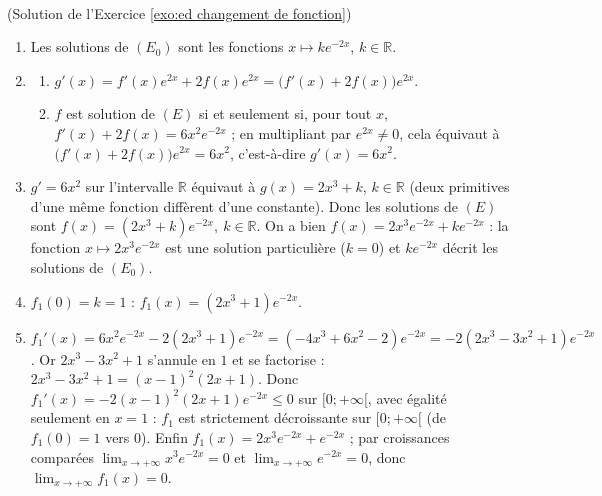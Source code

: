 \begin{corrige}
\begin{sol} ~ \\
(Solution de l'Exercice \ref{exo:ed changement de fonction})
\begin{enumerate}
\item Les solutions de $(E_0)$ sont les fonctions $x \mapsto k e^{-2x}$, $k \in \mathbb{R}$.
\item \begin{enumerate}
      \item $g'(x) = f'(x) e^{2x} + 2 f(x) e^{2x} = \big(f'(x) + 2f(x)\big) e^{2x}$.
      \item $f$ est solution de $(E)$ si et seulement si, pour tout $x$, $f'(x) + 2f(x) = 6x^2 e^{-2x}$ ;
            en multipliant par $e^{2x} \neq 0$, cela \'equivaut \`a $\big(f'(x) + 2f(x)\big)e^{2x} = 6x^2$,
            c'est-\`a-dire $g'(x) = 6x^2$.
      \end{enumerate}
\item $g' = 6x^2$ sur l'intervalle $\mathbb{R}$ \'equivaut \`a $g(x) = 2x^3 + k$, $k \in \mathbb{R}$
      (deux primitives d'une m\^eme fonction diff\`erent d'une constante).
      Donc les solutions de $(E)$ sont $\boxed{f(x) = (2x^3 + k) e^{-2x}, \ k \in \mathbb{R}}$.
      On a bien $f(x) = 2x^3 e^{-2x} + k e^{-2x}$ : la fonction $x \mapsto 2x^3 e^{-2x}$ est une solution particuli\`ere
      ($k = 0$) et $k e^{-2x}$ d\'ecrit les solutions de $(E_0)$.
\item $f_1(0) = k = 1$ : $\boxed{f_1(x) = (2x^3 + 1) e^{-2x}}$.
\item $f_1'(x) = 6x^2 e^{-2x} - 2(2x^3 + 1) e^{-2x} = (-4x^3 + 6x^2 - 2) e^{-2x} = -2(2x^3 - 3x^2 + 1) e^{-2x}$.
      Or $2x^3 - 3x^2 + 1$ s'annule en $1$ et se factorise : $2x^3 - 3x^2 + 1 = (x - 1)^2 (2x + 1)$.
      Donc $f_1'(x) = -2 (x-1)^2 (2x+1) e^{-2x} \leq 0$ sur $[0 ; +\infty[$, avec \'egalit\'e seulement en $x = 1$ :
      $f_1$ est strictement d\'ecroissante sur $[0;+\infty[$ (de $f_1(0) = 1$ vers $0$).
      Enfin $f_1(x) = 2 x^3 e^{-2x} + e^{-2x}$ ; par croissances compar\'ees $\lim_{x \to +\infty} x^3 e^{-2x} = 0$
      et $\lim_{x \to +\infty} e^{-2x} = 0$, donc $\lim_{x \to +\infty} f_1(x) = 0$.
\end{enumerate}
\end{sol}


\end{corrige}
